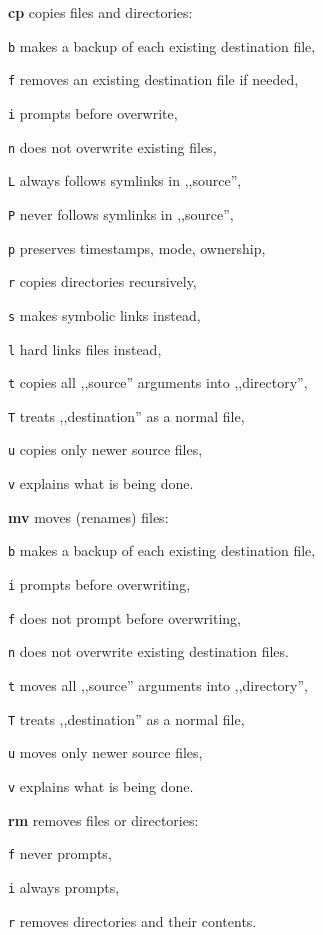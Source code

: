 \begin{enumx}
	\item [\cmdblack] \textbf{cp} copies files and directories:
	\item [\texttt{b}] makes a backup of each existing destination file,
	\item [\texttt{f}] removes an existing destination file if needed,
	\item [\texttt{i}] prompts before overwrite,
	\item [\texttt{n}] does not overwrite existing files,
	\item [\texttt{L}] always follows symlinks in ,,source'',
	\item [\texttt{P}] never follows symlinks in ,,source'',
	\item [\texttt{p}] preserves timestamps, mode, ownership,
	\item [\texttt{r}] copies directories recursively,
	\item [\texttt{s}] makes symbolic links instead,
	\item [\texttt{l}] hard links files instead,
	\item [\texttt{t}] copies all ,,source'' arguments into ,,directory'',
	\item [\texttt{T}] treats ,,destination'' as a normal file,
	\item [\texttt{u}] copies only newer source files,
	\item [\texttt{v}] explains what is being done.
	
	\item [\cmdblack] \textbf{mv} moves (renames) files:
	\item [\texttt{b}] makes a backup of each existing destination file,
	\item [\texttt{i}] prompts before overwriting,
	\item [\texttt{f}] does not prompt before overwriting,
	\item [\texttt{n}] does not overwrite existing destination files.
	\item [\texttt{t}] moves all ,,source'' arguments into ,,directory'',
	\item [\texttt{T}] treats ,,destination'' as a normal file,
	\item [\texttt{u}] moves only newer source files,
	\item [\texttt{v}] explains what is being done.
	
	\item [\cmdblack] \textbf{rm} removes files or directories:
	\item [\texttt{f}] never prompts,
	\item [\texttt{i}] always prompts,
	\item [\texttt{r}] removes directories and their contents.


\end{enumx}
